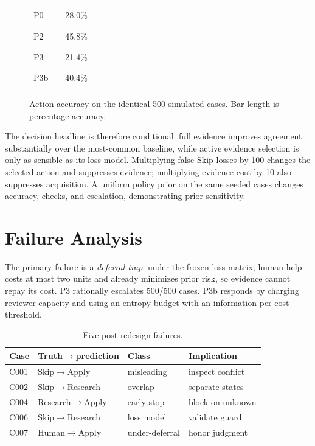 \documentclass{article}
\begin{document}
\begin{figure}[t]
\centering\small
\begin{tabular}{lcl}
P0  & \rule{28mm}{5pt} & 28.0\%\\
P2  & \rule{45.8mm}{5pt} & 45.8\%\\
P3  & \rule{21.4mm}{5pt} & 21.4\%\\
P3b & \rule{40.4mm}{5pt} & 40.4\%\\
\end{tabular}
\caption{Action accuracy on the identical 500 simulated cases. Bar length is percentage accuracy.}
\label{fig:accuracy}
\end{figure}

The decision headline is therefore conditional: full evidence improves agreement substantially over the most-common baseline, while active evidence selection is only as sensible as its loss model. Multiplying false-Skip losses by 100 changes the selected action and suppresses evidence; multiplying evidence cost by 10 also suppresses acquisition. A uniform policy prior on the same seeded cases changes accuracy, checks, and escalation, demonstrating prior sensitivity.

\section{Failure Analysis}
The primary failure is a \emph{deferral trap}: under the frozen loss matrix, human help costs at most two units and already minimizes prior risk, so evidence cannot repay its cost. P3 rationally escalates 500/500 cases. P3b responds by charging reviewer capacity and using an entropy budget with an information-per-cost threshold.

\begin{table}[t]
\centering\scriptsize
\caption{Five post-redesign failures.}
\begin{tabular}{llll}
\toprule
Case&Truth$\rightarrow$prediction&Class&Implication\\
\midrule
C001&Skip$\rightarrow$Apply&misleading&inspect conflict\\
C002&Skip$\rightarrow$Research&overlap&separate states\\
C004&Research$\rightarrow$Apply&early stop&block on unknown\\
C006&Skip$\rightarrow$Research&loss model&validate guard\\
C007&Human$\rightarrow$Apply&under-deferral&honor judgment\\
\bottomrule
\end{tabular}
\end{table}
\end{document}

